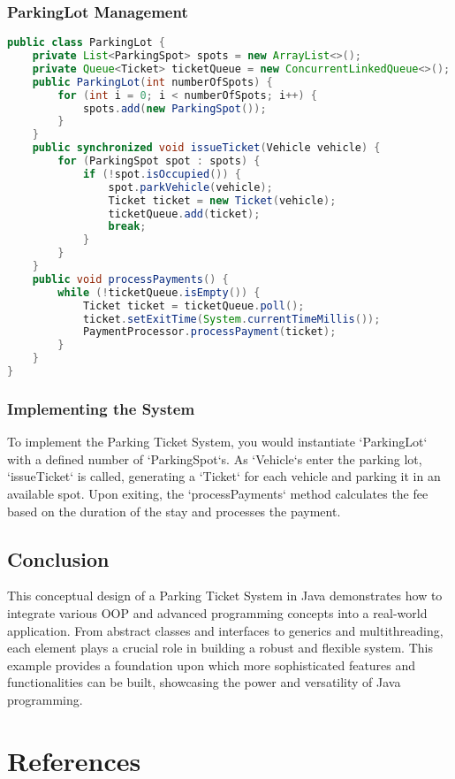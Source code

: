 \documentclass{article}
\begin{document}
\newpage
\subsubsection{ParkingLot Management}
\begin{lstlisting}[language=Java]
public class ParkingLot {
    private List<ParkingSpot> spots = new ArrayList<>();
    private Queue<Ticket> ticketQueue = new ConcurrentLinkedQueue<>();
    public ParkingLot(int numberOfSpots) {
        for (int i = 0; i < numberOfSpots; i++) {
            spots.add(new ParkingSpot());
        }
    }
    public synchronized void issueTicket(Vehicle vehicle) {
        for (ParkingSpot spot : spots) {
            if (!spot.isOccupied()) {
                spot.parkVehicle(vehicle);
                Ticket ticket = new Ticket(vehicle);
                ticketQueue.add(ticket);
                break;
            }
        }
    }
    public void processPayments() {
        while (!ticketQueue.isEmpty()) {
            Ticket ticket = ticketQueue.poll();
            ticket.setExitTime(System.currentTimeMillis());
            PaymentProcessor.processPayment(ticket);
        }
    }
}
\end{lstlisting}

\subsubsection{Implementing the System}
To implement the Parking Ticket System, you would instantiate `ParkingLot` with a defined number of `ParkingSpot`s. As `Vehicle`s enter the parking lot, `issueTicket` is called, generating a `Ticket` for each vehicle and parking it in an available spot. Upon exiting, the `processPayments` method calculates the fee based on the duration of the stay and processes the payment.

\subsection{Conclusion}
This conceptual design of a Parking Ticket System in Java demonstrates how to integrate various OOP and advanced programming concepts into a real-world application. From abstract classes and interfaces to generics and multithreading, each element plays a crucial role in building a robust and flexible system. This example provides a foundation upon which more sophisticated features and functionalities can be built, showcasing the power and versatility of Java programming.


\newpage
\section{References}
\end{document}
